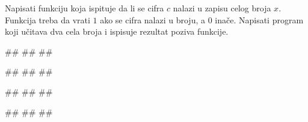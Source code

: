 \begin{Exercise}[label=v1.4_09] 
Napisati funkciju  koja ispituje da li
se cifra $c$ nalazi u zapisu celog broja $x$. Funkcija treba da vrati
$1$ ako se cifra nalazi u broju, a $0$ inače. Napisati program koji
učitava dva cela broja i ispisuje rezultat poziva funkcije.

\begin{miditest}
\begin{upotreba}{1}
#\naslovInt#
##
##
\end{upotreba}
\end{miditest}
\begin{miditest}
\begin{upotreba}{2}
#\naslovInt#
##
##
\end{upotreba}
\end{miditest}

\begin{miditest}
\begin{upotreba}{3}
#\naslovInt#
##
##
\end{upotreba}
\end{miditest}
\begin{miditest}
\begin{upotreba}{4}
#\naslovInt#
##
##
\end{upotreba}
\end{miditest}

\end{Exercise}
\begin{Answer}[ref=v1.4_09]
\end{Answer}


